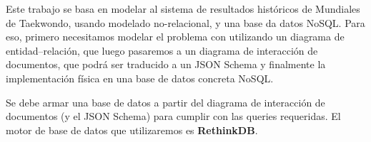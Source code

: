 Este trabajo se basa en modelar al sistema de resultados históricos de Mundiales de Taekwondo, usando modelado no-relacional, y una base da datos NoSQL.
Para eso, primero necesitamos modelar el problema con utilizando un diagrama de entidad--relación, que luego pasaremos a un diagrama de interacción de documentos, que podrá ser traducido a un JSON Schema y finalmente la implementación física en una base de datos concreta NoSQL.

Se debe armar una base de datos a partir del diagrama de interacción de documentos (y el JSON Schema) para cumplir con las queries requeridas. El motor de base de datos que utilizaremos es \textbf{RethinkDB}.

